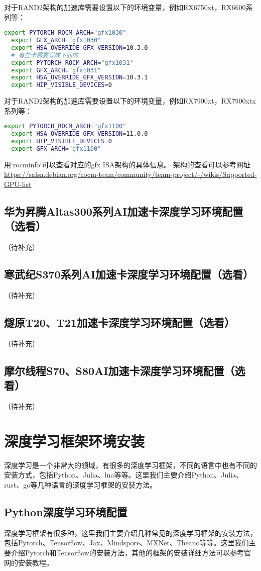 \documentclass[lang=cn,a4paper,newtx]{elegantpaper}
\begin{document}
对于RAND2架构的加速库需要设置以下的环境变量，例如RX6750xt，RX6600系列等：
\begin{lstlisting}[language=bash]
  export PYTORCH_ROCM_ARCH="gfx1030"
  export GFX_ARCH="gfx1030"
  export HSA_OVERRIDE_GFX_VERSION=10.3.0
  # 有些卡需要写成下面的
  export PYTORCH_ROCM_ARCH="gfx1031"
  export GFX_ARCH="gfx1031"
  export HSA_OVERRIDE_GFX_VERSION=10.3.1
  export HIP_VISIBLE_DEVICES=0
\end{lstlisting}

对于RAND2架构的加速库需要设置以下的环境变量，例如RX7900xt，RX7900xtx系列等：
\begin{lstlisting}[language=bash]
  export PYTORCH_ROCM_ARCH="gfx1100"
  export HSA_OVERRIDE_GFX_VERSION=11.0.0
  export HIP_VISIBLE_DEVICES=0
  export GFX_ARCH="gfx1100"
\end{lstlisting}
用`rocminfo`可以查看对应的gfx ISA架构的具体信息。
架构的查看可以参考网址\url{https://salsa.debian.org/rocm-team/community/team-project/-/wikis/Supported-GPU-list}

\subsection{华为昇腾Altas300系列AI加速卡深度学习环境配置（选看）}
（待补充）
\subsection{寒武纪S370系列AI加速卡深度学习环境配置（选看）}
（待补充）
\subsection{燧原T20、T21加速卡深度学习环境配置（选看）}
（待补充）
\subsection{摩尔线程S70、S80AI加速卡深度学习环境配置（选看）}
（待补充）
\section{深度学习框架环境安装}
深度学习是一个非常大的领域，有很多的深度学习框架，不同的语言中也有不同的安装方式，包括Python、Julia、lua等等。这里我们主要介绍Python、Julia、rust、go等几种语言的深度学习框架的安装方法。
\subsection{Python深度学习环境配置}
深度学习框架有很多种，这里我们主要介绍几种常见的深度学习框架的安装方法，包括Pytorch、Tensorflow、Jax、Mindspore、MXNet、Theano等等。这里我们主要介绍Pytorch和Tensorflow的安装方法，其他的框架的安装详细方法可以参考官网的安装教程。
\end{document}
